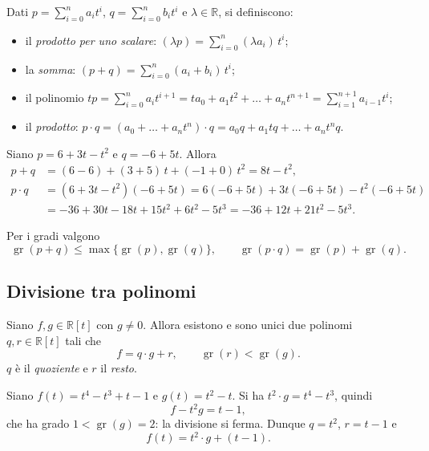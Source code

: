 \documentclass[11pt,a4paper]{article}
\begin{document}
Dati $p = \sum_{i=0}^{n} a_i t^i$, $q = \sum_{i=0}^{n} b_i t^i$ e
$\lambda \in \mathbb{R}$, si definiscono:
\begin{itemize}
    \item il \emph{prodotto per uno scalare}:
          $(\lambda p) = \sum_{i=0}^{n} (\lambda a_i)\, t^i$;
    \item la \emph{somma}: $(p + q) = \sum_{i=0}^{n} (a_i + b_i)\, t^i$;
    \item il polinomio $t p = \sum_{i=0}^{n} a_i t^{i+1}
          = t a_0 + a_1 t^2 + \dots + a_n t^{n+1}
          = \sum_{i=1}^{n+1} a_{i-1} t^i$;
    \item il \emph{prodotto}:
          $p \cdot q = (a_0 + \dots + a_n t^n) \cdot q
          = a_0 q + a_1 t q + \dots + a_n t^n q$.
\end{itemize}

\begin{esempio}
Siano $p = 6 + 3t - t^2$ e $q = -6 + 5t$. Allora
\begin{align*}
p + q &= (6 - 6) + (3 + 5)\,t + (-1 + 0)\,t^2 = 8t - t^2,\\
p \cdot q &= (6 + 3t - t^2)(-6 + 5t)
  = 6(-6 + 5t) + 3t(-6 + 5t) - t^2(-6 + 5t)\\
  &= -36 + 30t - 18t + 15t^2 + 6t^2 - 5t^3
  = -36 + 12t + 21t^2 - 5t^3 .
\end{align*}
\end{esempio}

\begin{osservazione}
Per i gradi valgono
\[
  \operatorname{gr}(p + q) \leq \max\{\operatorname{gr}(p), \operatorname{gr}(q)\},
  \qquad
  \operatorname{gr}(p \cdot q) = \operatorname{gr}(p) + \operatorname{gr}(q).
\]
\end{osservazione}

\subsection{Divisione tra polinomi}

\begin{teorema}
Siano $f, g \in \mathbb{R}[t]$ con $g \neq 0$. Allora esistono e sono unici due
polinomi $q, r \in \mathbb{R}[t]$ tali che
\[
  f = q \cdot g + r , \qquad \operatorname{gr}(r) < \operatorname{gr}(g).
\]
$q$ è il \emph{quoziente} e $r$ il \emph{resto}.
\end{teorema}

\begin{esempio}
Siano $f(t) = t^4 - t^3 + t - 1$ e $g(t) = t^2 - t$. Si ha
$t^2 \cdot g = t^4 - t^3$, quindi
\[
  f - t^2 g = t - 1 ,
\]
che ha grado $1 < \operatorname{gr}(g) = 2$: la divisione si ferma. Dunque
$q = t^2$, $r = t - 1$ e
\[
  f(t) = t^2 \cdot g + (t - 1).
\]
\end{esempio}
\end{document}

